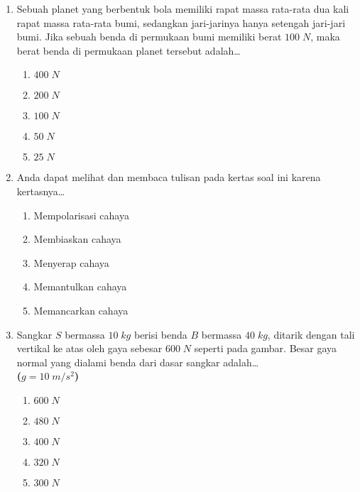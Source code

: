 \documentclass[A4,12PT, english, twocolumn]{journal}
\begin{document}
\begin{enumerate}
\item Sebuah planet yang berbentuk bola memiliki rapat massa rata-rata dua kali rapat massa rata-rata bumi, sedangkan jari-jarinya hanya setengah jari-jari bumi. Jika sebuah benda di permukaan bumi memiliki berat $100 \; N$, maka berat benda di permukaan planet tersebut adalah\dots
    \begin{enumerate}
        \item $400 \; N$
        \item $200 \; N$
        \item $100 \; N$
        \item $50 \; N$
        \item $25 \; N$
    \end{enumerate}

\item Anda dapat melihat dan membaca tulisan pada  kertas soal ini karena kertasnya\dots
    \begin{enumerate}
        \item Mempolarisasi cahaya
        \item Membiaskan cahaya
        \item Menyerap cahaya
        \item Memantulkan cahaya
        \item Memancarkan cahaya
    \end{enumerate}

\item Sangkar $S$ bermassa $10 \; kg$ berisi benda $B$ bermassa $40 \; kg$, ditarik dengan tali vertikal ke atas oleh gaya sebesar $600 \; N$ seperti pada gambar. Besar gaya normal yang dialami benda dari dasar sangkar
adalah\dots \\
\textbf{($g=10 \; m/s^2$)}
\begin{center}
\end{center}

    \begin{enumerate}
        \item $600 \; N$
        \item $480 \; N$
        \item $400 \; N$
        \item $320 \; N$
        \item $300 \; N$
    \end{enumerate}
    

\end{enumerate}
\end{document}
